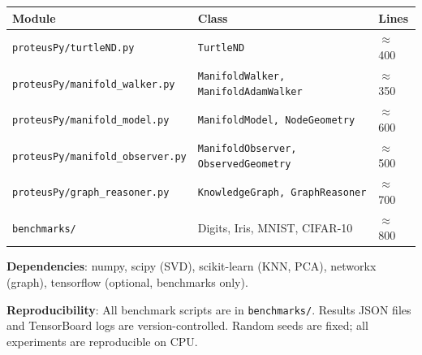 \documentclass[12pt,letterpaper]{article}
\begin{document}
\begin{table}[h]
\centering
\begin{tabular}{lll}
\toprule
Module & Class & Lines \\
\midrule
\texttt{proteusPy/turtleND.py}          & \texttt{TurtleND}                         & $\approx$400 \\
\texttt{proteusPy/manifold\_walker.py}  & \texttt{ManifoldWalker, ManifoldAdamWalker} & $\approx$350 \\
\texttt{proteusPy/manifold\_model.py}   & \texttt{ManifoldModel, NodeGeometry}      & $\approx$600 \\
\texttt{proteusPy/manifold\_observer.py}& \texttt{ManifoldObserver, ObservedGeometry} & $\approx$500 \\
\texttt{proteusPy/graph\_reasoner.py}   & \texttt{KnowledgeGraph, GraphReasoner}    & $\approx$700 \\
\texttt{benchmarks/}                    & Digits, Iris, MNIST, CIFAR-10             & $\approx$800 \\
\bottomrule
\end{tabular}
\end{table}

\noindent\textbf{Dependencies}: numpy, scipy (SVD), scikit-learn (KNN, PCA),
networkx (graph), tensorflow (optional, benchmarks only).

\noindent\textbf{Reproducibility}: All benchmark scripts are in
\texttt{benchmarks/}.  Results JSON files and TensorBoard logs are
version-controlled.  Random seeds are fixed; all experiments are reproducible on
CPU\@.
\end{document}
